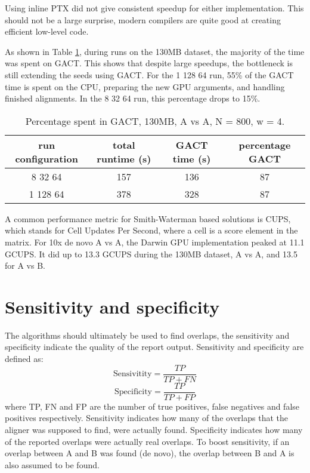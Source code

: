 \documentclass[../main/thesis.tex]{subfiles}
\begin{document}
Using inline PTX did not give consistent speedup for either implementation.
This should not be a large surprise, modern compilers are quite good at creating efficient low-level code.

As shown in Table \ref{tbl:darwin7}, during runs on the 130MB dataset, the majority of the time was spent on GACT.
This shows that despite large speedups, the bottleneck is still extending the seeds using GACT.
For the 1 128 64 run, 55\% of the GACT time is spent on the CPU, preparing the new GPU arguments, and handling finished alignments.
In the 8 32 64 run, this percentage drops to 15\%.
\begin{table}
\centering
\caption{Percentage spent in GACT, 130MB, A vs A, N = 800, w = 4.}
\label{tbl:darwin7}
\begin{tabular}{c|c c c}
run configuration & total runtime (s) & GACT time (s) & percentage GACT \\ \hline
8 32 64 & 157 & 136 & 87 \\
1 128 64 & 378 & 328 & 87 \\
\end{tabular}
\end{table}



A common performance metric for Smith-Waterman based solutions is CUPS, which stands for Cell Updates Per Second, where a cell is a score element in the matrix.
For 10x de novo A vs A, the Darwin GPU implementation peaked at 11.1 GCUPS.
It did up to 13.3 GCUPS during the 130MB dataset, A vs A, and 13.5 for A vs B.


\section{Sensitivity and specificity}
The algorithms should ultimately be used to find overlaps, the sensitivity and specificity indicate the quality of the report output.
Sensitivity and specificity are defined as:
$$\text{Sensivitity} = \frac{TP}{TP + FN}$$
$$\text{Specificity} = \frac{TP}{TP + FP}$$
where TP, FN and FP are the number of true positives, false negatives and false positives respectively.
Sensitivity indicates how many of the overlaps that the aligner was supposed to find, were actually found.
Specificity indicates how many of the reported overlaps were actually real overlaps.
To boost sensitivity, if an overlap between A and B was found (de novo), the overlap between B and A is also assumed to be found.
\end{document}
